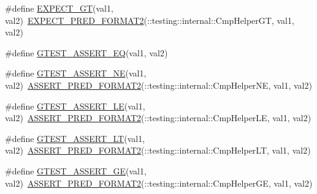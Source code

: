 \begin{DoxyCompactItemize}
\item 
\#define \mbox{\hyperlink{_obj__test_2lib_2googletest-release-1_88_81_2googletest_2include_2gtest_2gtest_8h_aa8bc8320813e1abb0016129b636e3b27}{E\+X\+P\+E\+C\+T\+\_\+\+GT}}(val1,  val2)~\mbox{\hyperlink{_obj__test_2lib_2googletest-release-1_88_81_2googletest_2include_2gtest_2gtest__pred__impl_8h_af0141918615a5e2d5247e9cda8324dae}{E\+X\+P\+E\+C\+T\+\_\+\+P\+R\+E\+D\+\_\+\+F\+O\+R\+M\+A\+T2}}(\+::testing\+::internal\+::\+Cmp\+Helper\+GT, val1, val2)
\item 
\#define \mbox{\hyperlink{_obj__test_2lib_2googletest-release-1_88_81_2googletest_2include_2gtest_2gtest_8h_a8a7a47387090810cdfe78933d348182d}{G\+T\+E\+S\+T\+\_\+\+A\+S\+S\+E\+R\+T\+\_\+\+EQ}}(val1,  val2)
\item 
\#define \mbox{\hyperlink{_obj__test_2lib_2googletest-release-1_88_81_2googletest_2include_2gtest_2gtest_8h_a6fa9bb2b6731eba8f481e40e9e4931b3}{G\+T\+E\+S\+T\+\_\+\+A\+S\+S\+E\+R\+T\+\_\+\+NE}}(val1,  val2)~\mbox{\hyperlink{_obj__test_2lib_2googletest-release-1_88_81_2googletest_2include_2gtest_2gtest__pred__impl_8h_ac452685a1a98ea3d96eb956a062ee210}{A\+S\+S\+E\+R\+T\+\_\+\+P\+R\+E\+D\+\_\+\+F\+O\+R\+M\+A\+T2}}(\+::testing\+::internal\+::\+Cmp\+Helper\+NE, val1, val2)
\item 
\#define \mbox{\hyperlink{_obj__test_2lib_2googletest-release-1_88_81_2googletest_2include_2gtest_2gtest_8h_abef04dcd4a0259d378de7b3b3ffb6730}{G\+T\+E\+S\+T\+\_\+\+A\+S\+S\+E\+R\+T\+\_\+\+LE}}(val1,  val2)~\mbox{\hyperlink{_obj__test_2lib_2googletest-release-1_88_81_2googletest_2include_2gtest_2gtest__pred__impl_8h_ac452685a1a98ea3d96eb956a062ee210}{A\+S\+S\+E\+R\+T\+\_\+\+P\+R\+E\+D\+\_\+\+F\+O\+R\+M\+A\+T2}}(\+::testing\+::internal\+::\+Cmp\+Helper\+LE, val1, val2)
\item 
\#define \mbox{\hyperlink{_obj__test_2lib_2googletest-release-1_88_81_2googletest_2include_2gtest_2gtest_8h_a5a75667e637febd18e5f7d4f3abf55e8}{G\+T\+E\+S\+T\+\_\+\+A\+S\+S\+E\+R\+T\+\_\+\+LT}}(val1,  val2)~\mbox{\hyperlink{_obj__test_2lib_2googletest-release-1_88_81_2googletest_2include_2gtest_2gtest__pred__impl_8h_ac452685a1a98ea3d96eb956a062ee210}{A\+S\+S\+E\+R\+T\+\_\+\+P\+R\+E\+D\+\_\+\+F\+O\+R\+M\+A\+T2}}(\+::testing\+::internal\+::\+Cmp\+Helper\+LT, val1, val2)
\item 
\#define \mbox{\hyperlink{_obj__test_2lib_2googletest-release-1_88_81_2googletest_2include_2gtest_2gtest_8h_a55373d99c079ff1b894e2eb5bcd15c5a}{G\+T\+E\+S\+T\+\_\+\+A\+S\+S\+E\+R\+T\+\_\+\+GE}}(val1,  val2)~\mbox{\hyperlink{_obj__test_2lib_2googletest-release-1_88_81_2googletest_2include_2gtest_2gtest__pred__impl_8h_ac452685a1a98ea3d96eb956a062ee210}{A\+S\+S\+E\+R\+T\+\_\+\+P\+R\+E\+D\+\_\+\+F\+O\+R\+M\+A\+T2}}(\+::testing\+::internal\+::\+Cmp\+Helper\+GE, val1, val2)

\end{DoxyCompactItemize}
